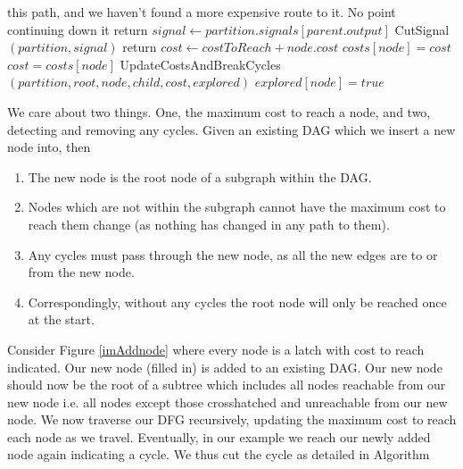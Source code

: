 \documentclass[12pt,final,oneside]{dwThesis} %
\begin{document}
\begin{algorithm}
\begin{algorithmic}[1]
{            this path, and we haven't found a more expensive route to it. No
            point continuing down it} \State return \EndIf {} 
         \State $signal \gets partition.signals[parent.output]$  \State CutSignal$(partition, signal)$
         \State return \EndIf \State $cost \gets costToReach+node.cost$
          \State $costs[node] = cost$ \Else \State
         $cost = costs[node]$ \EndIf {} \State
         UpdateCostsAndBreakCycles$(partition, root, node, child, cost,
         explored)$ \EndFor \State $explored[node] = true$ \EndProcedure
      \end{algorithmic} \end{algorithm} We care about two things. One, the
   maximum cost to reach a node, and two, detecting and removing any cycles.
   Given an existing \gls{DAG} which we insert a new node into, then
   \begin{enumerate}
      \item The new node is the root node of a subgraph within the \gls{DAG}.
      \item Nodes which are not within the subgraph cannot have the maximum
            cost to reach them change (as nothing has changed in any path to
            them).
      \item Any cycles must pass through the new node, as all the new edges are
            to or from the new node.
      \item Correspondingly, without any cycles the root node will only be
            reached once at the start.  \end{enumerate} Consider Figure
      \ref{imAddnode} where every node is a latch with cost to reach indicated.
      Our new node (filled in) is added to an existing \gls{DAG}. Our new node
      should now be the root of a subtree which includes all nodes reachable
      from our new node i.e. all nodes except those crosshatched and
      unreachable from our new node.  We now traverse our \gls{DFG}
      recursively, updating the maximum cost to reach each node as we travel.
      Eventually, in our example we reach our newly added node again indicating
      a cycle. We thus cut the cycle as detailed in Algorithm
\end{document}
